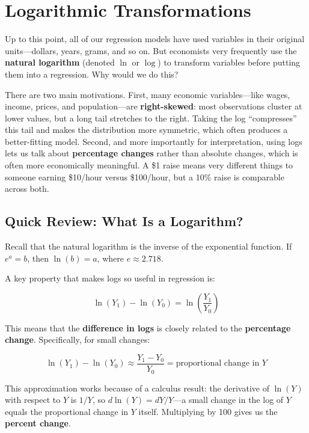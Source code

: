 \documentclass[
  letterpaper,
  DIV=11,
  numbers=noendperiod]{scrreprt}
\begin{document}
\section{Logarithmic Transformations}\label{logarithmic-transformations}

Up to this point, all of our regression models have used variables in
their original units---dollars, years, grams, and so on. But economists
very frequently use the \textbf{natural logarithm} (denoted \(\ln\) or
\(\log\)) to transform variables before putting them into a regression.
Why would we do this?

There are two main motivations. First, many economic variables---like
wages, income, prices, and population---are \textbf{right-skewed}: most
observations cluster at lower values, but a long tail stretches to the
right. Taking the log ``compresses'' this tail and makes the
distribution more symmetric, which often produces a better-fitting
model. Second, and more importantly for interpretation, using logs lets
us talk about \textbf{percentage changes} rather than absolute changes,
which is often more economically meaningful. A \$1 raise means very
different things to someone earning \$10/hour versus \$100/hour, but a
10\% raise is comparable across both.

\subsection{Quick Review: What Is a
Logarithm?}\label{quick-review-what-is-a-logarithm}

Recall that the natural logarithm is the inverse of the exponential
function. If \(e^a = b\), then \(\ln(b) = a\), where
\(e \approx 2.718\).

A key property that makes logs so useful in regression is:

\[
\ln(Y_1) - \ln(Y_0) = \ln\left(\frac{Y_1}{Y_0}\right)
\]

This means that the \textbf{difference in logs} is closely related to
the \textbf{percentage change}. Specifically, for small changes:

\[
\ln(Y_1) - \ln(Y_0) \approx \frac{Y_1 - Y_0}{Y_0} = \text{proportional change in } Y
\]

This approximation works because of a calculus result: the derivative of
\(\ln(Y)\) with respect to \(Y\) is \(1/Y\), so \(d\ln(Y) = dY/Y\)---a
small change in the log of \(Y\) equals the proportional change in \(Y\)
itself. Multiplying by 100 gives us the \textbf{percent change}.
\end{document}
